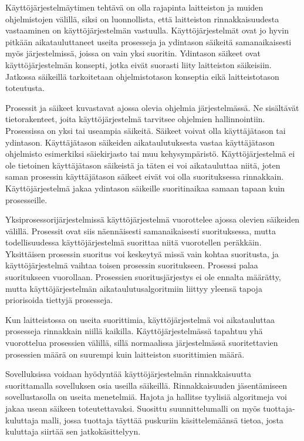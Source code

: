 \documentclass[a4paper, 12pt]{article}
\begin{document}
Käyttöjärjestelmäytimen tehtävä on olla rajapinta laitteiston ja muiden ohjelmistojen 
välillä, siksi on luonnollista, että laitteiston rinnakkaisuudesta vastaaminen
on käyttöjärjestelmän vastuulla. Käyttöjärjestelmät ovat jo hyvin pitkään
aikatauluttaneet useita prosesseja ja ydintason säikeitä samanaikaisesti myös 
järjestelmissä, joissa on 
vain yksi suoritin.
Ydintason säikeet ovat käyttöjärjestelmän konsepti, jotka
eivät suorasti liity laitteiston säikeisiin. 
Jatkossa
säikeillä tarkoitetaan ohjelmistotason konseptia 
eikä laitteistotason toteutusta.


Prosessit ja säikeet kuvastavat ajossa olevia
ohjelmia järjestelmässä. Ne sisältävät tietorakenteet,
joita käyttöjärjestelmä tarvitsee ohjelmien hallinnointiin.
Prosessissa on yksi tai useampia säikeitä.
Säikeet voivat olla käyttäjätason tai ydintason. Käyttäjätason 
säikeiden aikataulutuksesta vastaa käyttäjätason ohjelmisto
esimerkiksi säiekirjasto tai muu kehysympäristö.
Käyttöjärjestelmä ei ole tietoinen käyttäjätason säikeistä
ja täten ei voi aikatauluttaa niitä, joten saman
prosessin käyttäjätason säikeet eivät voi olla
suorituksessa rinnakkain. 
Käyttöjärjestelmä jakaa ydintason säikeille suoritinaikaa samaan
tapaan kuin prosesseille.


Yksiprosessorijärjestelmissä käyttöjärjestelmä vuorottelee
ajossa olevien säikeiden välillä. Prosessit
ovat siis näennäisesti samanaikaisesti suorituksessa,
mutta todellisuudessa käyttöjärjestelmä suorittaa
niitä vuorotellen peräkkäin. Yksittäisen prosessin
suoritus voi keskeytyä missä vain kohtaa suoritusta, 
ja käyttöjärjestelmä vaihtaa toisen prosessin suoritukseen.
Prosessi palaa suoritukseen vuorollaan.
Prosessien suoritusjärjestys ei ole ennalta määrätty, mutta
käyttöjärjestelmän aikataulutusalgoritmiin liittyy yleensä
tapoja priorisoida tiettyjä prosesseja.


Kun laitteistossa on useita suorittimia, käyttöjärjestelmä
voi aikatauluttaa prosesseja rinnakkain niillä kaikilla.
Käyttöjärjestelmässä tapahtuu yhä
vuorottelua prosessien välillä, sillä normaalissa
järjestelmässä suoritettavien prosessien määrä on suurempi
kuin laitteiston suorittimien määrä.

Sovelluksissa voidaan hyödyntää käyttöjärjestelmän
rinnakkaisuutta suorittamalla sovelluksen osia useilla säikeillä.
Rinnakkaisuuden jäsentämiseen sovellustasolla on useita
menetelmiä. 
Hajota ja hallitse tyylisiä 
algoritmeja voi jakaa usean säikeen
toteutettavaksi.
Suosittu suunnittelumalli on myös
tuottaja-kuluttaja malli, jossa tuottaja täyttää
puskuriin käsittelemäänsä tietoa, josta kuluttaja siirtää
sen jatkokäsittelyyn.
\end{document}

